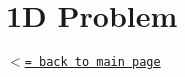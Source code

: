 \hypertarget{__allencahn__allencahn_1D}{}\section{1\+D Problem}\label{__allencahn__allencahn_1D}
\href{index.html}{\tt $<$= back to main page} 